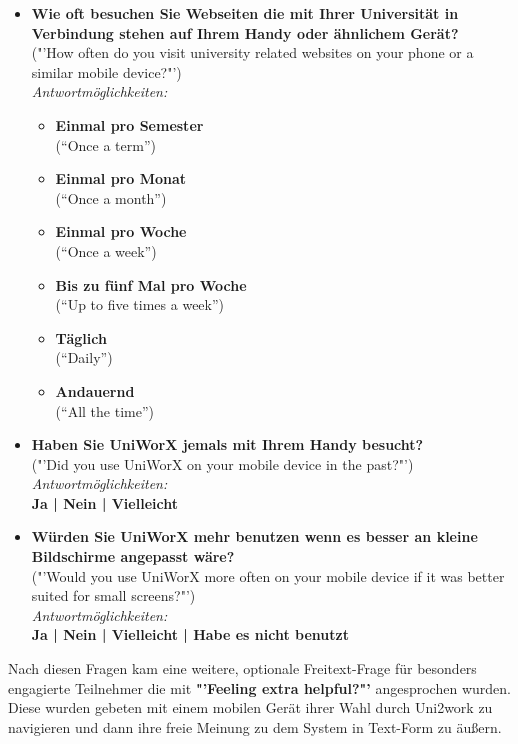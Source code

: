 \documentclass[11pt,a4paper,twoside,ngerman]{article}
\begin{document}
\begin{itemize}
    \item \textbf{Wie oft besuchen Sie Webseiten die mit Ihrer Universität in Verbindung stehen auf Ihrem Handy oder ähnlichem Gerät?} \\ ("'How often do you visit university related websites on your phone or a similar mobile device?"') \\
    \emph{Antwortmöglichkeiten:}
        
    \begin{itemize}
        \item \textbf{Einmal pro Semester} \\ ("`Once a term"')
        \item \textbf{Einmal pro Monat} \\ ("`Once a month"')
        \item \textbf{Einmal pro Woche} \\ ("`Once a week"')
        \item \textbf{Bis zu fünf Mal pro Woche} \\ ("`Up to five times a week"')
        \item \textbf{Täglich} \\ ("`Daily"')
        \item \textbf{Andauernd} \\ ("`All the time"')
    \end{itemize}
    
    \item \textbf{Haben Sie UniWorX jemals mit Ihrem Handy besucht?} \\ ("'Did you use UniWorX on your mobile device in the past?"') \\ \emph{Antwortmöglichkeiten:} \\ \textbf{Ja | Nein | Vielleicht}
    
    \item \textbf{Würden Sie UniWorX mehr benutzen wenn es besser an kleine Bildschirme angepasst wäre?} \\ ("'Would you use UniWorX more often on your mobile device if it was better suited for small screens?"') \\ \emph{Antwortmöglichkeiten:} \\ \textbf{Ja | Nein | Vielleicht | Habe es nicht benutzt}
\end{itemize}

\noindent
Nach diesen Fragen kam eine weitere, optionale Freitext-Frage für besonders engagierte Teilnehmer die mit \textbf{"'Feeling extra helpful?"'} angesprochen wurden. Diese wurden gebeten mit einem mobilen Gerät ihrer Wahl durch Uni2work zu navigieren und dann ihre freie Meinung zu dem System in Text-Form zu äußern.
\end{document}
